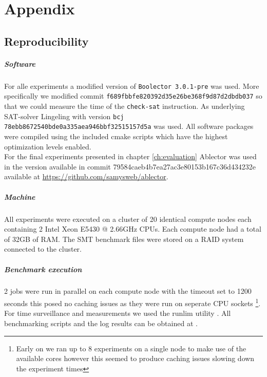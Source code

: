 \chapter{Appendix}
\label{chap:appendix}

\section{Reproducibility}
\label{sec:appendix:reproducibility}
\paragraph{Software}
For alle experiments a modified version of \texttt{Boolector 3.0.1-pre} was used.
More specifically we modified commit \texttt{f689fbbfe820392d35e26be368f9d87d2dbdb037} so that we could measure the time of the \texttt{check-sat} instruction.
As underlying SAT-solver Lingeling with version \texttt{bcj 78ebb8672540bde0a335aea946bbf32515157d5a} was used.
All software packages were compiled using the included cmake scripts which have the highest optimization levels enabled.\\
For the final experiments presented in chapter \ref{ch:evaluation} Ablector was used in the version available in commit 79584caeb4b7ea27ac3e80153b167c36d434232e available at \url{https://github.com/samysweb/ablector}.

\paragraph{Machine}
All experiments were executed on a cluster of 20 identical compute nodes each containing 2 Intel Xeon E5430 @ 2.66GHz CPUs.
Each compute node had a total of 32GB of RAM.
The SMT benchmark files were stored on a RAID system connected to the cluster.

\paragraph{Benchmark execution}
2 jobs were run in parallel on each compute node with the timeout set to 1200 seconds
this posed no caching issues as they were run on seperate CPU sockets
\footnote{Early on we ran up to 8 experiments on a single node to make use of the available cores however this seemed to produce caching issues slowing down the experiment times}.
For time surveillance and measurements we used the runlim utility \cite{runlim}.
All benchmarking scripts and the log results can be obtained at .
